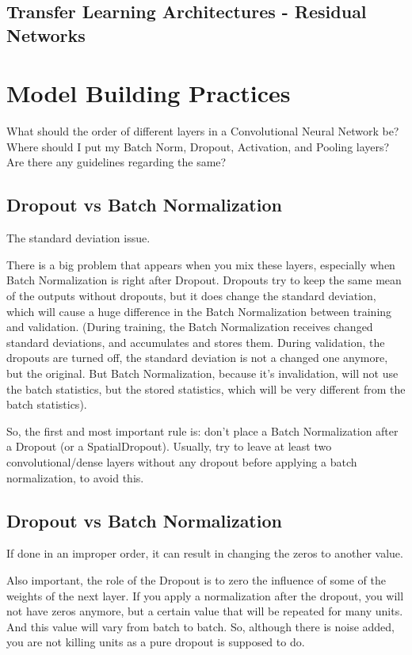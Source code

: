 	\subsection{Transfer Learning Architectures - Residual Networks}

	\section{Model Building Practices}
What should the order of different layers in a Convolutional Neural Network be? Where should I put my Batch Norm, Dropout, Activation, and Pooling layers?  Are there any guidelines regarding the same?

	\subsection{Dropout vs Batch Normalization}
The standard deviation issue.

There is a big problem that appears when you mix these layers, especially when Batch Normalization is right after Dropout.
Dropouts try to keep the same mean of the outputs without dropouts, but it does change the standard deviation, which will cause a huge difference in the Batch Normalization between training and validation. (During training, the Batch Normalization receives changed standard deviations, and accumulates and stores them. During validation, the dropouts are turned off, the standard deviation is not a changed one anymore, but the original. But Batch Normalization, because it's invalidation, will not use the batch statistics, but the stored statistics, which will be very different from the batch statistics).

So, the first and most important rule is: don't place a Batch Normalization after a Dropout (or a SpatialDropout).
Usually,  try to leave at least two convolutional/dense layers without any dropout before applying a batch normalization, to avoid this.

	\subsection{Dropout vs Batch Normalization}
If done in an improper order, it can result in changing the zeros to another value.

Also important, the role of the Dropout is to zero the influence of some of the weights of the next layer.  If you apply a normalization after the dropout, you will not have zeros anymore, but a certain value that will be repeated for many units.  And this value will vary from batch to batch. So, although there is noise added, you are not killing units as a pure dropout is supposed to do.

